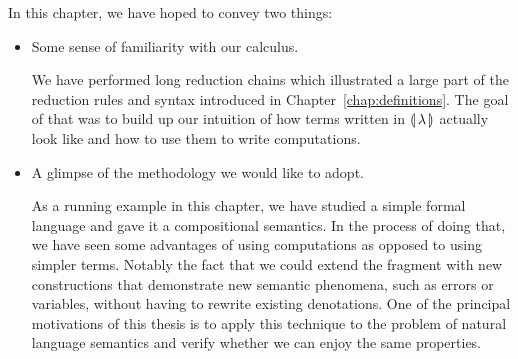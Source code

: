 In this chapter, we have hoped to convey two things:

\begin{itemize}
\item Some sense of familiarity with our calculus. 

  We have performed long reduction chains which illustrated a large part of
  the reduction rules and syntax introduced in
  Chapter~\ref{chap:definitions}. The goal of that was to build up our
  intuition of how terms written in ${\llparenthesis \, \lambda \, \rrparenthesis}$ actually look like and how to
  use them to write computations.

\item A glimpse of the methodology we would like to adopt.

  As a running example in this chapter, we have studied a simple formal
  language and gave it a compositional semantics. In the process of doing
  that, we have seen some advantages of using computations as opposed to
  using simpler terms. Notably the fact that we could extend the fragment
  with new constructions that demonstrate new semantic phenomena, such as
  errors or variables, without having to rewrite existing denotations. One
  of the principal motivations of this thesis is to apply this technique to
  the problem of natural language semantics and verify whether we can enjoy
  the same properties.
\end{itemize}
